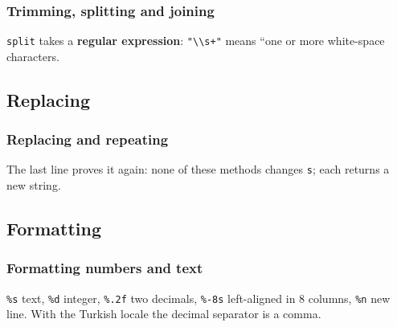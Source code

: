 \documentclass[aspectratio=169,10pt,compress]{beamer}
\begin{document}
\begin{frame}[t,fragile] \frametitle{Trimming, splitting and joining}

  \vspace{0.3em}
  \small \texttt{split} takes a \textbf{regular expression}: \texttt{"\textbackslash\textbackslash s+"} means ``one or more white-space characters.
\end{frame}




\subsection[Replace]{Replacing}




\begin{frame}[t,fragile] \frametitle{Replacing and repeating}

  \vspace{0.3em}
  \small The last line proves it again: none of these methods changes \texttt{s}; each returns a new string.
\end{frame}




\subsection[Format]{Formatting}




\begin{frame}[t,fragile] \frametitle{Formatting numbers and text}

  \vspace{0.3em}
  \small \texttt{\%s} text, \texttt{\%d} integer, \texttt{\%.2f} two decimals, \texttt{\%-8s} left-aligned in 8 columns, \texttt{\%n} new line.
  With the Turkish locale the decimal separator is a comma.
\end{frame}
\end{document}
